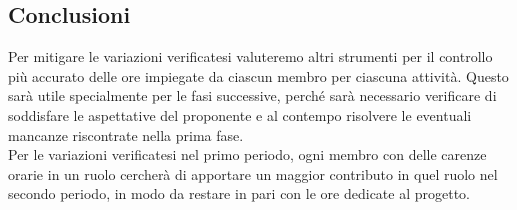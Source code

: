 	\subsection{Conclusioni}
	Per mitigare le variazioni verificatesi valuteremo altri strumenti per il controllo più accurato delle ore impiegate da ciascun membro per ciascuna attività.
	Questo sarà utile specialmente per le fasi successive, perché sarà necessario verificare di soddisfare le aspettative del proponente e al contempo risolvere le eventuali mancanze riscontrate nella prima fase.\\
	Per le variazioni verificatesi nel primo periodo, ogni membro con delle carenze orarie in un ruolo cercherà di apportare un maggior contributo in quel ruolo nel secondo periodo, in modo da restare in pari con le ore dedicate al progetto.
	